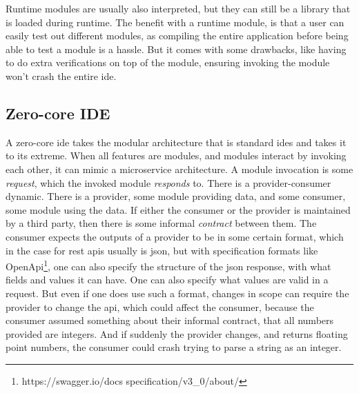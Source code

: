 Runtime modules are usually also interpreted, but they can still be a
library that is loaded during runtime. The benefit with a runtime module,
is that a user can easily test out different modules, as compiling the entire
application before being able to test a module is a hassle. But it comes with
some drawbacks, like having to do extra verifications on top of the module,
ensuring invoking the module won't crash the entire \gls*{ide}.


\subsection{Zero-core IDE}

A zero-core \gls*{ide} takes the modular architecture that is standard
\gls*{ide}s and takes it to its extreme. When all features are modules, and
modules interact by invoking each other, it can mimic a microservice
architecture. A module invocation is some \textit{request}, which the invoked
module \textit{responds} to. There is a provider-consumer dynamic. There is a
provider, some module providing data, and some consumer, some module using the
data. If either the consumer or the provider is maintained by a third party,
then there is some informal \textit{contract} between them. The consumer
expects the outputs of a provider to be in some certain format, which in the
case for \gls*{rest} \gls*{api}s usually is \gls*{json}, but with
specification formats like OpenApi\footnote{https://swagger.io/docs
specification/v3\_0/about/}, one can also specify the structure of the
\gls*{json} response, with what fields and values it can have. One can also
specify what values are valid in a request. But even if one does use such a
format, changes in scope can require the provider to change the \gls*{api},
which could affect the consumer, because the consumer assumed something about
their informal contract, that all numbers provided are integers. And if
suddenly the provider changes, and returns floating point numbers, the
consumer could crash trying to parse a string as an integer. 

